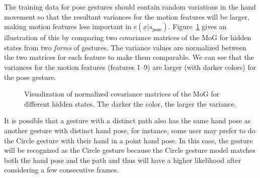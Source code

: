 The training data for pose gestures should contain random variations in the
hand movement so that the resultant variances for the motion features will be
larger, making motion features less important in
$e(\underline{x}|s_{\text{pose}})$. Figure~\ref{fig:covariance} gives an
illustration of this by comparing two covariance matrices of the MoG for hidden
states from two \textit{forms} of gestures.
The variance values are normalized between the two matrices for each feature to make
them comparable. We can see that the variances for the motion features (features
1--9) are larger (with darker colors) for the pose gesture.

\begin{figure}[tbh]
\centering
{}
\caption{Visualization of normalized covariance matrices of the MoG for
different hidden states. The darker the color, the larger the variance.}
\label{fig:covariance}
\end{figure}

It is possible that a gesture with a distinct path also has the same hand pose
as another gesture with distinct hand pose, for instance, some user may prefer
to do the Circle gesture with their hand in a point hand pose. In this case, the
gesture will be recognized as the Circle gesture because the Circle gesture
model matches both the hand pose and the path and thus will 
have a higher likelihood after considering a few consecutive frames.

